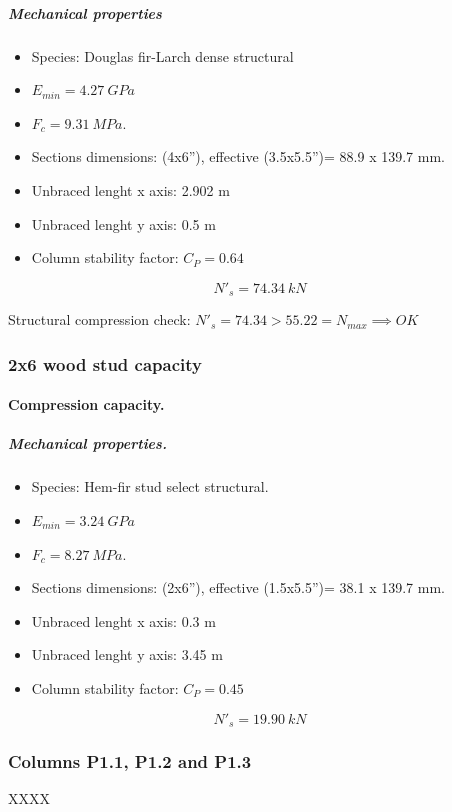 \subparagraph{Mechanical properties}

\begin{itemize}
\item Species: Douglas fir-Larch dense structural
\item $E_{min}= 4.27\ GPa$
\item $F_c= 9.31\ MPa$.
\item Sections dimensions: (4x6''), effective (3.5x5.5'')= 88.9 x 139.7  mm.
\item Unbraced lenght x axis: 2.902 m
\item Unbraced lenght y axis: 0.5 m
\item Column stability factor: $C_P= 0.64$
\end{itemize}

\begin{equation}
  N'_s= 74.34\ kN
\end{equation}

\noindent Structural compression check: $N'_s = 74.34 > 55.22 = N_{max} \implies OK$

\subsubsection{2x6 wood stud capacity}

\paragraph{Compression capacity.}

\subparagraph{Mechanical properties.}

\begin{itemize}
\item Species: Hem-fir stud select structural.
\item $E_{min}= 3.24\ GPa$
\item $F_c= 8.27\ MPa$.
\item Sections dimensions: (2x6''), effective (1.5x5.5'')= 38.1 x 139.7  mm.
\item Unbraced lenght x axis: 0.3 m
\item Unbraced lenght y axis: 3.45 m
\item Column stability factor: $C_P= 0.45$
\end{itemize}

\begin{equation}
  N'_s= 19.90\ kN
\end{equation}


\subsubsection{Columns P1.1, P1.2 and P1.3}
XXXX
